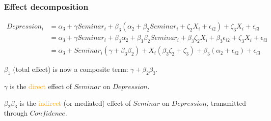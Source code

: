 \documentclass[11pt,english,dvipsnames,aspectratio=169,handout]{beamer}\usepackage[]{graphicx}\usepackage[]{xcolor}
\begin{document}
\begin{frame}
  \frametitle{Effect decomposition}
  \scriptsize
  \begin{align}
  Depression_i &= \alpha_3 + \gamma Seminar_i + \beta_3(\alpha_2 + \beta_2Seminar_i + \zeta_2X_i + \epsilon_{i2}) + \zeta_3X_i + \epsilon_{i3} \\
        &= \alpha_3 + \gamma Seminar_i + \beta_3\alpha_2 + \beta_3\beta_2Seminar_i + \beta_3\zeta_2X_i + \beta_3\epsilon_{i2} + \zeta_3X_i + \epsilon_{i3} \\
        &= \alpha_3 + Seminar_i(\gamma + \beta_3\beta_2) + X_i(\beta_3\zeta_2 + \zeta_3) + \beta_3(\alpha_2 + \epsilon_{i2}) + \epsilon_{i3}
  \end{align}
  \pause
  \normalsize
  
  $\beta_1$ (total effect) is now a composite term: $\gamma + \beta_2\beta_3$.\bigskip
  \pause
  
  $\gamma$ is the \textcolor{orange}{direct} effect of $Seminar$ on $Depression$.\bigskip
  
  $\beta_2\beta_3$ is the \textcolor{orange}{indirect} (or mediated) effect of $Seminar$ on $Depression$, transmitted through $Confidence$.
  
\end{frame}
\end{document}
